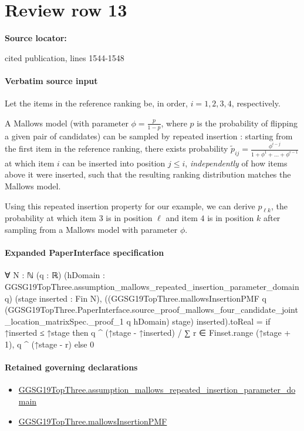 \documentclass[10pt]{article}
\begin{document}
\section*{Review row 13}
\textbf{Source locator:} {\footnotesize\raggedright cited publication, lines 1544-\allowbreak{}1548\par}
\paragraph{Verbatim source input}
\begin{ReviewVerbatim}
Let the items in the reference ranking be, in order, $i=1, 2, 3, 4$, respectively.

A Mallows model (with parameter $\phi = \frac{p}{1-p}$, where $p$ is the probability of flipping a given pair of candidates) can be sampled by repeated insertion \citep{lu14a,diaconis_group_nodate}: starting from the first item in the reference ranking, there exists probability $\tilde{p}_{ij} = \frac{\phi^{i-j}}{1 + \phi^1 + \dots + \phi^{i-1}}$ at which item $i$ can be inserted into position $j\leq i$, \textit{independently} of how items above it were inserted, such that the resulting ranking distribution matches the Mallows model.

Using this repeated insertion property for our example, we can derive $p_{\ell k}$, the probability at which item $3$ is in position $\ell$ and item $4$ is in position $k$ after sampling from a Mallows model with parameter $\phi$.
\end{ReviewVerbatim}



\paragraph{Expanded PaperInterface specification}
\begin{ReviewVerbatim}
∀ {N : ℕ} (q : ℝ) (hDomain : GGSG19TopThree.assumption_mallows_repeated_insertion_parameter_domain q)
  (stage inserted : Fin N),
  ((GGSG19TopThree.mallowsInsertionPMF q
          (GGSG19TopThree.PaperInterface.source_proof_mallows_four_candidate_joint_location_matrixSpec._proof_1 q
            hDomain)
          stage)
        inserted).toReal =
    if ↑inserted ≤ ↑stage then q ^ (↑stage - ↑inserted) / ∑ r ∈ Finset.range (↑stage + 1), q ^ (↑stage - r) else 0
\end{ReviewVerbatim}

\paragraph{Retained governing declarations}
\begin{itemize}\raggedright
\item \hyperlink{paper-prerequisite-6aeda38fed7688bf}{GGSG19\allowbreak{}Top\allowbreak{}Three.\allowbreak{}assumption\_\allowbreak{}mallows\_\allowbreak{}repeated\_\allowbreak{}insertion\_\allowbreak{}parameter\_\allowbreak{}domain}
\item \hyperlink{governing-declaration-a23364fe8e8d5a57}{GGSG19\allowbreak{}Top\allowbreak{}Three.\allowbreak{}mallows\allowbreak{}Insertion\allowbreak{}PMF}
\end{itemize}
\end{document}
